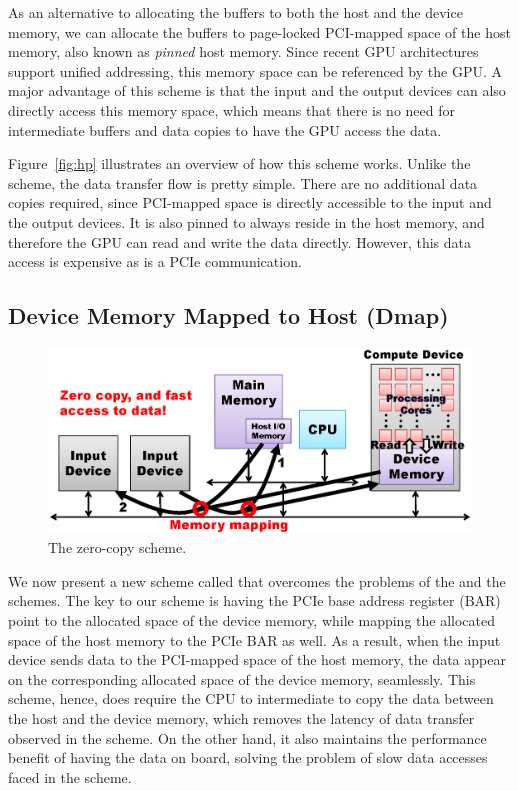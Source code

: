 As an alternative to allocating the buffers to both the host and the
device memory, we can allocate the buffers to page-locked PCI-mapped
space of the host memory, also known as \textit{pinned} host memory.
Since recent GPU architectures support unified addressing, this memory
space can be referenced by the GPU.
A major advantage of this scheme is that the input and the output
devices can also directly access this memory space, which means that
there is no need for intermediate buffers and data copies to have the
GPU access the data.

Figure~\ref{fig:hp} illustrates an overview of how this scheme works.
Unlike the {\hd} scheme, the data transfer flow is pretty simple.
There are no additional data copies required, since PCI-mapped space is
directly accessible to the input and the output devices.
It is also pinned to always reside in the host memory, and therefore the
GPU can read and write the data directly.
However, this data access is expensive as is a PCIe communication.

\subsection{Device Memory Mapped to Host (Dmap)}
\label{sec:dm}

\begin{figure}[!t]
 \centering
 \includegraphics[width=\hsize]{eps/dm.eps}
 \caption{The zero-copy {\dm} scheme.}
 \label{fig:dm}
\end{figure}

We now present a new scheme called {\dm} that overcomes the
problems of the {\hd} and the {\hp} schemes.
The key to our scheme is having the PCIe base address register
(BAR) point to the allocated space of the device memory, while mapping
the allocated space of the host memory to the PCIe BAR as well.
As a result, when the input device sends data to the PCI-mapped space of
the host memory, the data appear on the corresponding allocated space of
the device memory, seamlessly.
This scheme, hence, does require the CPU to intermediate to copy the
data between the host and the device memory, which removes the latency
of data transfer observed in the {\hd} scheme.
On the other hand, it also maintains the performance benefit of having
the data on board, solving the problem of slow data accesses faced in
the {\hp} scheme.

